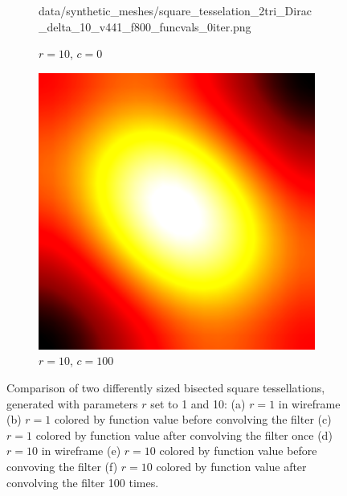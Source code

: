 \begin{figure}[ht]
\begin{subfigure}[b]{0.32\linewidth}
		{data/synthetic_meshes/square_tesselation_2tri_Dirac_delta_10_v441_f800_funcvals_0iter.png}
		\caption{$r=10$, $c=0$}\label{fig:sq2.e}
	\end{subfigure}
	\begin{subfigure}[b]{0.32\linewidth}
		\includegraphics[width=\linewidth]
		{data/synthetic_meshes/square_tesselation_2tri_Dirac_delta_10_v441_f800_funcvals_100iter.png}
		\caption{$r=10$, $c=100$}\label{fig:sq2.f}
	\end{subfigure}
	\caption[Six Views Comparing Bisected Square Tessellations]{Comparison of two differently sized bisected square tessellations, generated with parameters $r$ set to 1 and 10: (a) $r=1$ in wireframe (b) $r=1$ colored by function value before convolving the filter (c) $r=1$ colored by function value after convolving the filter once (d) $r=10$ in wireframe (e) $r=10$ colored by function value before convoving the filter (f) $r=10$ colored by function value after convolving the filter 100 times.}
	\label{fig:sq2}
\end{figure}
